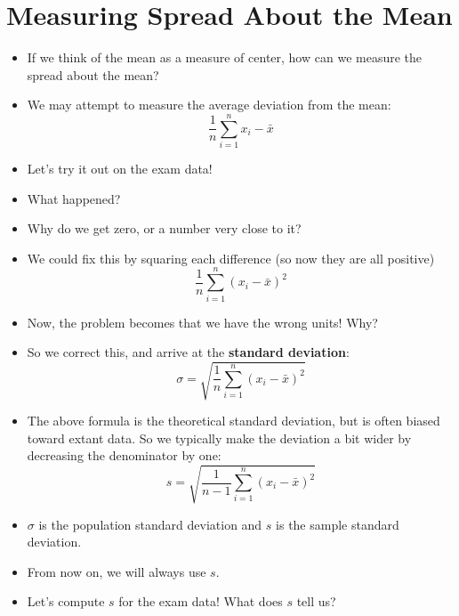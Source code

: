 \documentclass{article}
\begin{document}
\section{Measuring Spread About the Mean}
\begin{itemize}
    \item If we think of the mean as a measure of center, how can we
        measure  the spread about the mean?
    \item We may attempt to measure the average deviation from the
        mean:
        \[
            \dfrac{1}{n} \displaystyle\sum_{i=1}^{n} x_i - \bar{x}
        \]
    \item Let's try it out on the exam data!
    \item What happened? 
    \item Why do we get zero, or a number very close to it?
    \item We could fix this by squaring each difference (so now they
        are all positive)
        \[
            \dfrac{1}{n} \displaystyle\sum_{i=1}^{n} (x_i - \bar{x})^2
        \]
    \item Now, the problem becomes that we have the wrong units!  Why?
    \item So we correct this, and arrive at the \textbf{standard
        deviation}:
        \[
            \sigma = \sqrt{\dfrac{1}{n} \displaystyle\sum_{i=1}^{n}
            (x_i - \bar{x})^2}
        \]
    \item The above formula is the theoretical standard deviation, but
        is often biased toward extant data.  So we typically make the
        deviation a bit wider by decreasing the denominator by one:
        \[
            s = \sqrt{\dfrac{1}{n-1} \displaystyle\sum_{i=1}^{n}
            (x_i - \bar{x})^2}
        \]
    \item $\sigma$ is the population standard deviation and $s$ is the
        sample standard deviation.
    \item From now on, we will always use $s$.
    \item Let's compute $s$ for the exam data! What does $s$ tell us?
\end{itemize}
\end{document}
